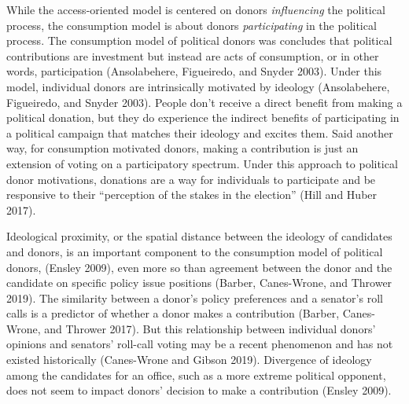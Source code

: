 \documentclass[12pt,]{article}
\begin{document}
While the access-oriented model is centered on donors \emph{influencing}
the political process, the consumption model is about donors
\emph{participating} in the political process. The consumption model of
political donors was concludes that political contributions are
investment but instead are acts of consumption, or in other words,
participation (Ansolabehere, Figueiredo, and Snyder 2003). Under this
model, individual donors are intrinsically motivated by ideology
(Ansolabehere, Figueiredo, and Snyder 2003). People don't receive a
direct benefit from making a political donation, but they do experience
the indirect benefits of participating in a political campaign that
matches their ideology and excites them. Said another way, for
consumption motivated donors, making a contribution is just an extension
of voting on a participatory spectrum. Under this approach to political
donor motivations, donations are a way for individuals to participate
and be responsive to their ``perception of the stakes in the election''
(Hill and Huber 2017).

Ideological proximity, or the spatial distance between the ideology of
candidates and donors, is an important component to the consumption
model of political donors, (Ensley 2009), even more so than agreement
between the donor and the candidate on specific policy issue positions
(Barber, Canes-Wrone, and Thrower 2019). The similarity between a
donor's policy preferences and a senator's roll calls is a predictor of
whether a donor makes a contribution (Barber, Canes-Wrone, and Thrower
2017). But this relationship between individual donors' opinions and
senators' roll-call voting may be a recent phenomenon and has not
existed historically (Canes-Wrone and Gibson 2019). Divergence of
ideology among the candidates for an office, such as a more extreme
political opponent, does not seem to impact donors' decision to make a
contribution (Ensley 2009).
\end{document}
